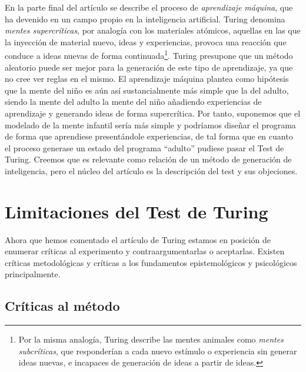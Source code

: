 \documentclass[12pt]{memoir}
\begin{document}
En la parte final del artículo se describe el proceso de \textit{aprendizaje máquina}, que ha devenido en un campo propio en la inteligencia artificial. Turing denomina \textit{mentes supercríticas}, por analogía con los materiales atómicos, aquellas en las que la inyección de material nuevo, ideas y experiencias, provoca una reacción que conduce a ideas nuevas de forma continuada\footnote{Por la misma analogía, Turing describe las mentes animales como \textit{mentes subcríticas}, que responderían a cada nuevo estímulo o experiencia sin generar ideas nuevas, e incapaces de generación de ideas a partir de ideas.}. Turing presupone que un método aleatorio puede ser mejor para la generación de este tipo de aprendizaje, ya que no cree ver reglas en el mismo. El aprendizaje máquina  plantea como hipótesis que la mente del niño es aún así sustancialmente más simple que la del adulto, siendo la mente del adulto la mente del niño añadiendo experiencias de aprendizaje y generando ideas de forma supercrítica. Por tanto, suponemos que el modelado de la mente infantil sería más simple y podríamos diseñar el programa de forma que aprendiese presentándole experiencias, de tal forma que en cuanto el proceso generase un estado del programa ``adulto'' pudiese pasar el Test de Turing. Creemos que es relevante como relación de un método de generación de inteligencia, pero el núcleo del artículo es la descripción del test y sus objeciones.


\section{Limitaciones del Test de Turing}

Ahora que hemos comentado el artículo de Turing estamos en posición de enumerar  críticas al experimento y contraargumentarlas o aceptarlas. Existen críticas metodológicas y críticas a los fundamentos epistemológicos y psicológicos principalmente.

\nocite{katrina}
\nocite{afterTuring}
\nocite{turingHarmful}
\nocite{harnad}
\nocite{sep-turing-test}

\subsection{Críticas al método}
\end{document}
